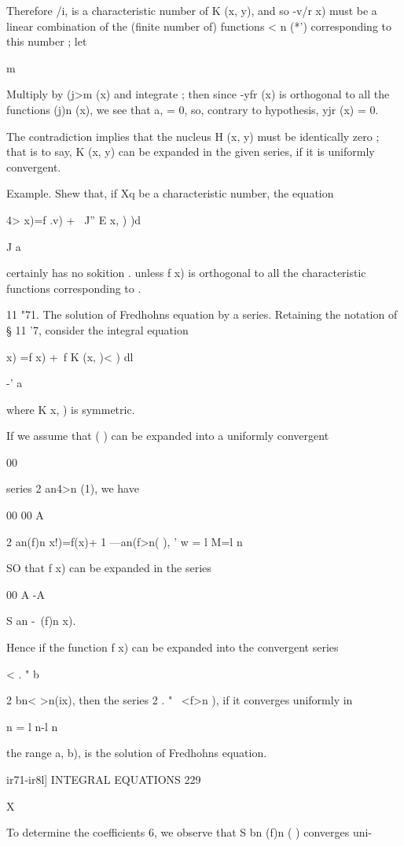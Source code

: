 {Therefore /i, is a characteristic number of K (x, y), and so -v/r x)
must be a linear combination of the (finite number of) functions < n
(*') corresponding to this number ; let

m

Multiply by (j>m (x) and integrate ; then since -yfr (x) is orthogonal
to all the functions (j)n (x), we see that a, = 0, so, contrary to
hypothesis, yjr (x) = 0.

The contradiction implies that the nucleus H (x, y) must be
identically zero ; that is to say, K (x, y) can be expanded in the
given series, if it is uniformly convergent.

Example. Shew that, if Xq be a characteristic number, the equation

4> x)=f .v) + \ J'' E x, ) )d

J a

certainly has no sokition . unless f x) is orthogonal to all the
characteristic functions corresponding to .

11 "71. The solution of Fredhohns equation by a series. Retaining the
notation of § 11 '7, consider the integral equation

   x) =f x) +\ f K (x, )< ) dl

-' a

where K x, ) is symmetric.

If we assume that ( ) can be expanded into a uniformly convergent

00

series 2 an4>n (1), we have

00 00 A

2 an(f)n x!)=f(x)+ 1 —an(f>n( ), ' w = l M=l n

SO that f x) can be expanded in the series

00 A -A

S an -\ (f)n x).

Hence if the function f x) can be expanded into the convergent series

< . " b \

2 bn< >n(ix), then the series 2 . " \ <f>n ), if it converges
uniformly in

n = l n-l n

the range a, b), is the solution of Fredhohns equation.



ir71-ir8l] INTEGRAL EQUATIONS 229

X

To determine the coefficients 6, we observe that S bn (f)n ( )
converges uni-

}
